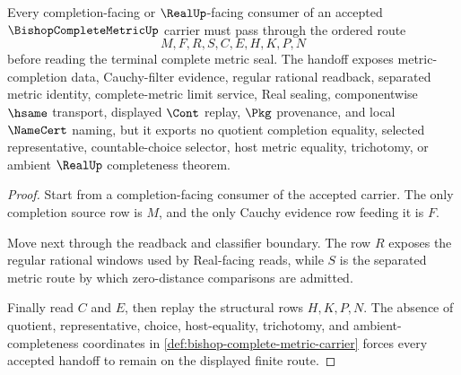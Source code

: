 \begin{theorem}
\label{thm:bishop-complete-metric-completion-handoff}
Every completion-facing or $\RealUp$-facing consumer of an accepted $\BishopCompleteMetricUp$ carrier must pass through the ordered route
$$
M,F,R,S,C,E,H,K,P,N
$$
before reading the terminal complete metric seal. The handoff exposes metric-completion data, Cauchy-filter evidence, regular rational readback, separated metric identity, complete-metric limit service, Real sealing, componentwise $\hsame$ transport, displayed $\Cont$ replay, $\Pkg$ provenance, and local $\NameCert$ naming, but it exports no quotient completion equality, selected representative, countable-choice selector, host metric equality, trichotomy, or ambient $\RealUp$ completeness theorem.
\end{theorem}
\begin{proof}
Start from a completion-facing consumer of the accepted carrier. The only completion source row is $M$, and the only Cauchy evidence row feeding it is $F$.

Move next through the readback and classifier boundary. The row $R$ exposes the regular rational windows used by Real-facing reads, while $S$ is the separated metric route by which zero-distance comparisons are admitted.

Finally read $C$ and $E$, then replay the structural rows $H,K,P,N$. The absence of quotient, representative, choice, host-equality, trichotomy, and ambient-completeness coordinates in \autoref{def:bishop-complete-metric-carrier} forces every accepted handoff to remain on the displayed finite route.
\end{proof}



